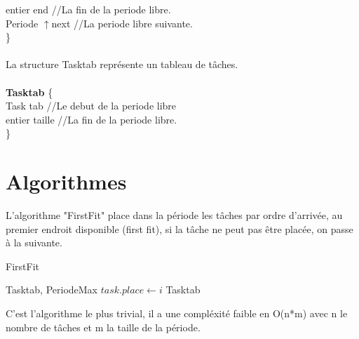 \documentclass[11pt]{article}
\begin{document}
    \indent \indent entier end \indent \indent //La fin de la periode libre.\\
    \indent \indent Periode $\uparrow$next \indent //La periode libre suivante.\\
\indent\}
\\\\
La structure Tasktab représente un tableau de tâches.\\\\
\indent \textbf{Tasktab} \{ \\
    \indent \indent Task tab    \indent \indent//Le debut de la periode libre\\
    \indent \indent entier taille \indent   //La fin de la periode libre.\\
\indent\}

\section{Algorithmes}

L'algorithme "FirstFit" place dans la période les tâches par ordre d'arrivée, au premier endroit disponible (first fit), si la tâche ne peut pas être placée, on passe à la suivante.
\begin{algorithm}
    \caption{FirstFit}
    \begin{algorithmic}
    \REQUIRE Tasktab, PeriodeMax
            \STATE $task.place \leftarrow i$
         \ENDIF
        \ENDFOR
    \ENDFOR
    \RETURN Tasktab
    \end{algorithmic}
\end{algorithm}

C'est l'algorithme le plus trivial, il a une compléxité faible en O(n*m) avec n le nombre de tâches et m la taille de la période.\\
\end{document}
